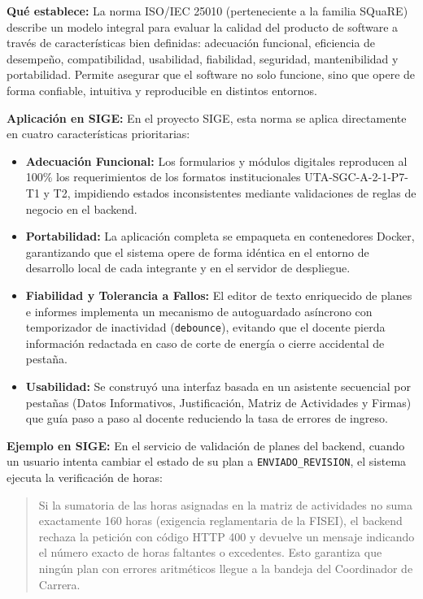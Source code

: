 \documentclass[12pt,a4paper]{article}
\begin{document}
\textbf{Qué establece:}
La norma ISO/IEC 25010 (perteneciente a la familia SQuaRE) describe un modelo integral para evaluar la calidad del producto de software a través de características bien definidas: adecuación funcional, eficiencia de desempeño, compatibilidad, usabilidad, fiabilidad, seguridad, mantenibilidad y portabilidad. Permite asegurar que el software no solo funcione, sino que opere de forma confiable, intuitiva y reproducible en distintos entornos.

\textbf{Aplicación en SIGE:}
En el proyecto SIGE, esta norma se aplica directamente en cuatro características prioritarias:
\begin{itemize}[leftmargin=1.5em, itemsep=2pt]
    \item \textbf{Adecuación Funcional:} Los formularios y módulos digitales reproducen al 100\% los requerimientos de los formatos institucionales UTA-SGC-A-2-1-P7-T1 y T2, impidiendo estados inconsistentes mediante validaciones de reglas de negocio en el backend.
    \item \textbf{Portabilidad:} La aplicación completa se empaqueta en contenedores Docker, garantizando que el sistema opere de forma idéntica en el entorno de desarrollo local de cada integrante y en el servidor de despliegue.
    \item \textbf{Fiabilidad y Tolerancia a Fallos:} El editor de texto enriquecido de planes e informes implementa un mecanismo de autoguardado asíncrono con temporizador de inactividad (\texttt{debounce}), evitando que el docente pierda información redactada en caso de corte de energía o cierre accidental de pestaña.
    \item \textbf{Usabilidad:} Se construyó una interfaz basada en un asistente secuencial por pestañas (Datos Informativos, Justificación, Matriz de Actividades y Firmas) que guía paso a paso al docente reduciendo la tasa de errores de ingreso.
\end{itemize}

\textbf{Ejemplo en SIGE:}
En el servicio de validación de planes del backend, cuando un usuario intenta cambiar el estado de su plan a \texttt{ENVIADO\_REVISION}, el sistema ejecuta la verificación de horas:
\begin{quote}
Si la sumatoria de las horas asignadas en la matriz de actividades no suma exactamente 160 horas (exigencia reglamentaria de la FISEI), el backend rechaza la petición con código HTTP 400 y devuelve un mensaje indicando el número exacto de horas faltantes o excedentes. Esto garantiza que ningún plan con errores aritméticos llegue a la bandeja del Coordinador de Carrera.
\end{quote}
\end{document}
